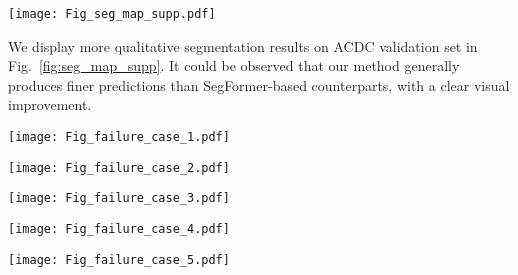 \documentclass[letterpaper]{article} \usepackage{aaai23}  \usepackage{times}  \usepackage{helvet}  \usepackage{courier}  \usepackage[hyphens]{url}  \usepackage{graphicx} \urlstyle{rm} \def\UrlFont{\rm}  \usepackage{natbib}  \usepackage{caption} \frenchspacing  \setlength{\pdfpagewidth}{8.5in}  \setlength{\pdfpageheight}{11in}  \usepackage{algorithm}
\newcommand{\method}{\texttt{VBLC}~}
\begin{document}
\begin{figure*}[!htbp]
  \centering
  \texttt{[image: Fig\_seg\_map\_supp.pdf]}
  \caption{Qualitative analysis of segmentation results on ACDC validation set. From left to right: Target adverse-condition images, results predicted by SegFormer, by DAFormer, and by our \method, as well as ground-truth labels are shown one by one.}
  \label{fig:seg_map_supp}
\end{figure*}

We display more qualitative segmentation results on ACDC validation set in Fig.~\ref{fig:seg_map_supp}. It could be observed that our method generally produces finer predictions than SegFormer-based counterparts, with a clear visual improvement.

\begin{figure*}[!htbp]
  \centering
  \texttt{[image: Fig\_failure\_case\_1.pdf]}
  \caption{Typical error cases on Cityscapes  ACDC: Misclassification of horizontal poles.}
  \label{fig:failure_case_1}
\end{figure*}

\begin{figure*}[!htbp]
  \centering
  \texttt{[image: Fig\_failure\_case\_2.pdf]}
  \caption{Typical error cases on Cityscapes  ACDC: Misclassification of overhead wires.}
  \label{fig:failure_case_2}
\end{figure*}

\begin{figure*}[!htbp]
  \centering
  \texttt{[image: Fig\_failure\_case\_3.pdf]}
  \caption{Typical error cases on Cityscapes  ACDC: Misclassification of sky and sidewalks due to darkness.}
  \label{fig:failure_case_3}
\end{figure*}

\begin{figure*}[!htbp]
  \centering
  \texttt{[image: Fig\_failure\_case\_4.pdf]}
  \caption{Typical error cases on Cityscapes  ACDC: Misclassification of sidewalks due to surface gathered water.}
  \label{fig:failure_case_4}
\end{figure*}

\begin{figure*}[!htbp]
  \centering
  \texttt{[image: Fig\_failure\_case\_5.pdf]}
  \caption{Typical error cases on Cityscapes  ACDC: Misclassification of terrain due to snow cover.}
  \label{fig:failure_case_5}
\end{figure*}
\end{document}

